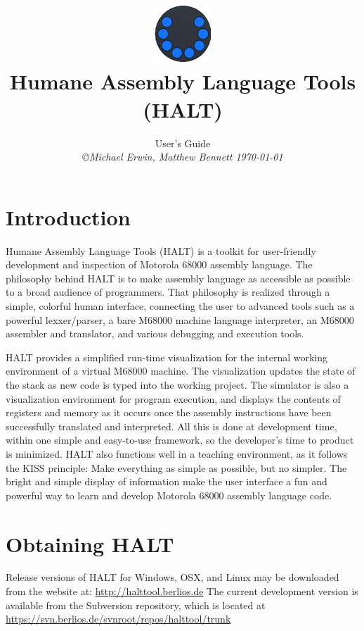 \documentclass[10pt,fullpage]{article}
\title{\includegraphics[scale=0.5]{logo1.png}\\Humane Assembly Language Tools (HALT)}
\author{User's Guide \\
{\small\em \copyright Michael Erwin, Matthew Bennett \today }}
\date{ }
\begin{document}
\maketitle
\tableofcontents

\section*{Introduction}

Humane Assembly Language Tools (HALT) is a toolkit for user-friendly
development and inspection of Motorola 68000 assembly language. The
philosophy behind HALT is to make assembly language as accessible as
possible to a broad audience of programmers. That philosophy is
realized through a simple, colorful human interface, connecting the
user to advanced tools such as a powerful lexxer/parser, a bare
M68000 machine language interpreter, an M68000 assembler and
translator, and various debugging and execution tools.

HALT provides a simplified run-time visualization for the internal
working environment of a virtual M68000 machine. The visualization
updates the state of the stack as new code is typed into the working
project. The simulator is also a visualization environment for
program execution, and displays the contents of registers and memory
as it occurs once the assembly instructions have been successfully
translated and interpreted. All this is done at development time,
within one simple and easy-to-use framework, so the developer's time
to product is minimized. HALT also functions well in a teaching
environment, as it follows the KISS principle: Make everything as
simple as possible, but no simpler. The bright and simple display of
information make the user interface a fun and powerful way to learn
and develop Motorola 68000 assembly language code.

\section*{Obtaining HALT}

Release versions of HALT for Windows, OSX, and Linux may be
downloaded from the website at:
\href{http://halttool.berlios.de}{http://halttool.berlios.de} The
current development version is available from the Subversion
repository, which is located at
\href{https://svn.berlios.de/svnroot/repos/halttool/trunk}{https://svn.berlios.de/svnroot/repos/halttool/trunk}
\end{document}

